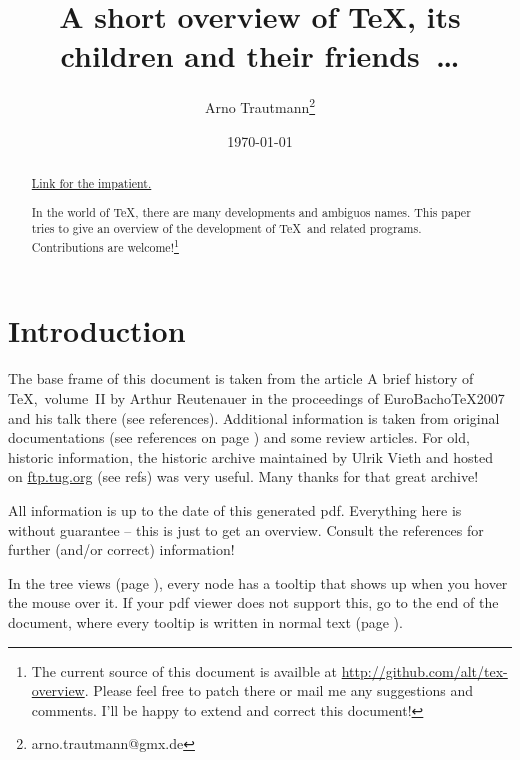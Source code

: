 \documentclass{scrartcl}
\title{A short overview of \TeX, its children and their friends~\dots}
\author{Arno Trautmann\thanks{arno.trautmann@gmx.de}}
\date{\today}
\begin{document}
\maketitle

\begin{abstract}
\centerline{\large \hyperref[textextview]{Link for the impatient.}}\vspace*{2ex}
In the world of \TeX, there are many developments and ambiguos names. This paper tries to give an overview of the development of \TeX\ and related programs. Contributions are welcome!\footnote{The current source of this document is availble at \url{http://github.com/alt/tex-overview}. Please feel free to patch there or mail me any suggestions and comments. I’ll be happy to extend and correct this document!}\\
\end{abstract}

\section{Introduction}
The base frame of this document is taken from the article \textsf{A brief history of \TeX,~volume~II} by Arthur Reutenauer in the proceedings of \textsf{EuroBacho\TeX 2007} and his talk there (see references). Additional information is taken from original documentations (see references on page \pageref{sec:refs}) and some review articles. For old, historic information, the \textsf{historic archive} maintained by Ulrik Vieth and hosted on \url{ftp.tug.org} (see refs) was very useful. Many thanks for that great archive!

All information is up to the date of this generated pdf. Everything here is without guarantee – this is just to get an overview. Consult the references for further (and/or correct) information! 

In the tree views (page \pageref{sec:tree}), every node has a tooltip that shows up when you hover the mouse over it. If your pdf viewer does not support this, go to the end of the document, where every tooltip is written in normal text (page \pageref{sec:text}).
\end{document}
